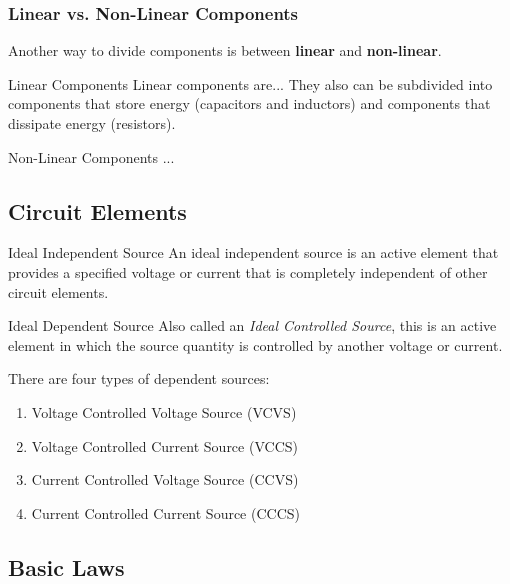 \documentclass[12pt]{article}
\begin{document}
\subsubsection{Linear vs. Non-Linear Components}
\label{sssec:linearVsNonlinearComponents}

Another way to divide components is between \textbf{linear} and \textbf{non-linear}.

\begin{definition}{Linear Components}
  Linear components are... They also can be subdivided into components that store energy (capacitors and inductors) and components that dissipate energy (resistors).
\end{definition}

\begin{definition}{Non-Linear Components}
  ...
\end{definition}
\subsection{Circuit Elements}
\label{ssec:circuitElements}

\begin{definition}{Ideal Independent Source}
  An ideal independent source is an active element that provides a specified voltage or current that is completely independent of other circuit elements.
\end{definition}

\begin{definition}{Ideal Dependent Source}
  Also called an \textit{Ideal Controlled Source}, this is an active element in which the source quantity is controlled by another voltage or current.
\end{definition}


There are four types of dependent sources:
\begin{enumerate}
  \itemsep0em
  \item Voltage Controlled Voltage Source (VCVS)
  \item Voltage Controlled Current Source (VCCS)
  \item Current Controlled Voltage Source (CCVS)
  \item Current Controlled Current Source (CCCS)
\end{enumerate}

\subsection{Basic Laws}
\label{ssec:basicLaws}
\end{document}

